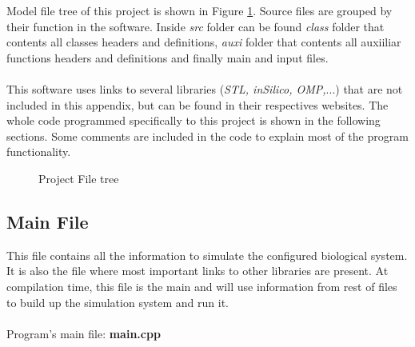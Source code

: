 


Model file tree of this project is shown in Figure \ref{fig:filetree}. Source files are grouped by their function in the software. Inside \textit{src} folder can be found \textit{class} folder that contents all classes headers and definitions, \textit{auxi} folder that contents all auxiiliar functions headers and definitions and finally main and input files.\\
\\
This software uses links to several libraries (\textit{STL, inSilico, OMP,}...) that are not included in this appendix, but can be found in their respectives websites. The whole code programmed specifically to this project is shown in the following sections. Some comments are included in the code to explain most of the program functionality.\\


\begin{figure}[h]
\centering
\setlength\fboxsep{0pt}
\setlength\fboxrule{0.5pt}
\caption{Project File tree}
\label{fig:filetree}
\end{figure}


\newpage
\subsection{Main File}
This file contains all the information to simulate the configured biological system. It is also the file where most important links to other libraries are present. At compilation time, this file is the main and will use information from rest of files to build up the simulation system and run it.\\
\\
Program's main file: \textbf{main.cpp}
 	



